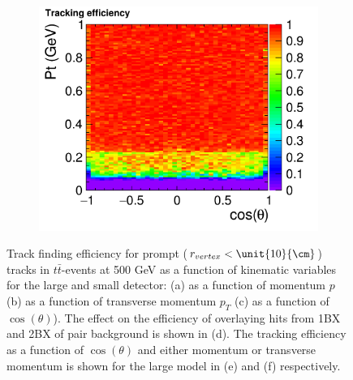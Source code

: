 \begin{figure}[htbp]
\begin{subfigure}{0.49\hsize}
 \caption{ \label{fig:perf:trkeff_2D_p}}
 \end{subfigure}
\begin{subfigure}{0.49\hsize} 
 \includegraphics[width=\hsize]{Performance/fig/newSiliconTracking_10kEvents_effTrk_Pt_v2.png}
 \caption{  \label{fig:perf:trkeff_2D_pt}}
 \end{subfigure}
\caption{
  Track finding efficiency for prompt ($r_{vertex}<\unit{10}{\cm}$) tracks in $t \bar t$-events at 500 GeV as a function of kinematic variables for the large and small detector:
  (a) as a function of momentum $p$  (b) as a function of transverse momentum $p_T$ (c) as a function of $\cos(\theta)$).
  The effect on the efficiency of overlaying hits from 1BX and 2BX of pair background is shown in (d). The tracking efficiency as a
  function of $\cos(\theta)$ and either momentum or transverse momentum is shown for the large model in (e) and (f) respectively. 
}
\label{fig:perf:trkeff}
\end{figure}

